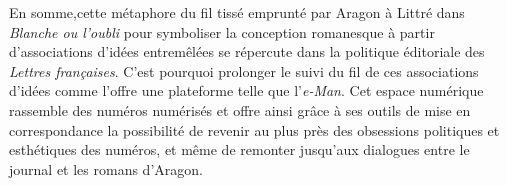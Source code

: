 En somme,cette métaphore du fil tissé emprunté par Aragon à Littré dans \emph{Blanche ou l'oubli} pour symboliser la conception romanesque à partir d'associations d'idées entremêlées se répercute dans la politique éditoriale des \emph{Lettres françaises}. C'est pourquoi prolonger le suivi du fil de ces associations d'idées comme l'offre une plateforme telle que l'\emph{e-Man}. Cet espace numérique rassemble des numéros numérisés et offre ainsi grâce à ses outils de mise en correspondance la possibilité de revenir au plus près des obsessions politiques et esthétiques des numéros, et même de remonter jusqu'aux dialogues entre le journal et les romans d'Aragon. 